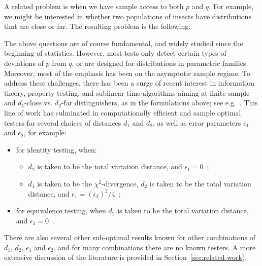 \medskip \noindent A related problem is when we have sample access to both $p$ and $q$. For example, we might be interested in whether two populations of insects have distributions that are close or far. The resulting problem is the following:

\medskip {}

\medskip The above questions are of course fundamental, and widely studied since the beginning of statistics.  However, most tests only detect certain types of deviations of $p$ from $q$, or are designed for distributions in parametric families. Moreover, most of the emphasis has been on the asymptotic sample regime. To address these challenges, there has been a surge of recent interest in information theory, property testing, and sublinear-time algorithms aiming at finite sample and $d_1$-close vs. $d_2$-far distinguishers, as in the formulations above; see e.g.\ \cite{BatuFFKRW01,BatuKR04,Paninski08,ValiantV17,AcharyaDK15,CanonneDGR16,DiakonikolasK16}. This line of work has culminated in computationally efficient and sample optimal testers for several choices of distances $d_1$ and $d_2$, as well as error parameters $\epsilon_1$ and $\epsilon_2$, for example:
\begin{itemize}
\item for identity testing, when: 
\begin{itemize}
\item $d_2$ is taken to be the total variation distance, and $\epsilon_1=0$~\cite{BatuFFKRW01, Paninski08,ValiantV17};

\item $d_1$ is taken to be the $\chi^2$-divergence, $d_2$ is taken to be the total variation distance, and $\epsilon_1=(\epsilon_2)^2/4$~\cite{AcharyaDK15, DiakonikolasK16};
\end{itemize}

\item for equivalence testing, when $d_2$ is taken to be the total variation distance, and $\epsilon_1=0$~\cite{BatuFRSW13, Valiant11, ChanDVV14}.

\end{itemize}
There are also several other sub-optimal results known for other combinations of $d_1$, $d_2$, $\epsilon_1$ and $\epsilon_2$, and for many combinations there are no known testers. A more extensive discussion of the literature is provided in Section~\ref{sec:related-work}.

